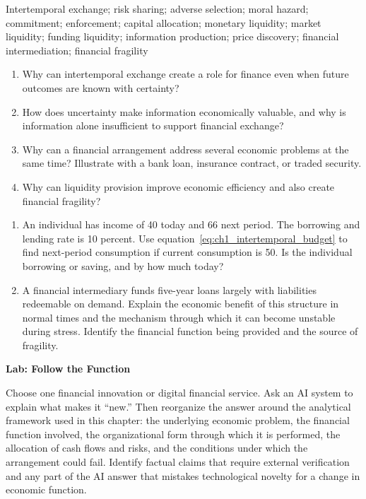 
Intertemporal exchange; risk sharing;
adverse selection; moral hazard; commitment; enforcement; capital allocation;
monetary liquidity; market liquidity; funding liquidity; information production;
price discovery; financial intermediation; financial fragility


\begin{enumerate}
\item Why can intertemporal exchange create a role for finance even when future outcomes are known with certainty?
\item How does uncertainty make information economically valuable, and why is information alone insufficient to support financial exchange?
\item Why can a financial arrangement address several economic problems at the same time? Illustrate with a bank loan, insurance contract, or traded security.
\item Why can liquidity provision improve economic efficiency and also create financial fragility?
\end{enumerate}


\begin{enumerate}
\item An individual has income of 40 today and 66 next period. The borrowing and lending rate is 10 percent. Use equation~\eqref{eq:ch1_intertemporal_budget} to find next-period consumption if current consumption is 50. Is the individual borrowing or saving, and by how much today?

\item A financial intermediary funds five-year loans largely with liabilities redeemable on demand. Explain the economic benefit of this structure in normal times and the mechanism through which it can become unstable during stress. Identify the financial function being provided and the source of fragility.
\end{enumerate}


\textbf{Lab: Follow the Function}

Choose one financial innovation or digital financial service. Ask an AI
system to explain what makes it ``new.'' Then reorganize the answer around
the analytical framework used in this chapter: the underlying economic
problem, the financial function involved, the organizational form through
which it is performed, the allocation of cash flows and risks, and the
conditions under which the arrangement could fail. Identify factual claims
that require external verification and any part of the AI answer that
mistakes technological novelty for a change in economic function.

